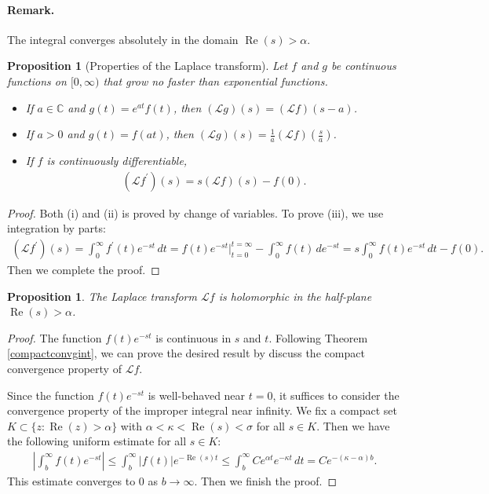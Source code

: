 \documentclass{article}
\numberwithin{equation}{section}
\newcommand{\bbC}{\mathbb{C}}
\renewcommand{\cal}{\mathcal}
\DeclareMathOperator{\re}{Re}
\theoremstyle{plain}
\newtheorem{proposition}[theorem]{Proposition}
\theoremstyle{definition}
\begin{document}
\paragraph{Remark.} The integral converges absolutely in the domain $\re(s)>\alpha$.
\begin{proposition}[Properties of the Laplace transform]
	Let $f$ and $g$ be continuous functions on $[0,\infty)$ that grow no faster than exponential functions.
	\begin{itemize}
		\item[(i)] If $a\in\bbC$ and $g(t)=e^{at} f(t)$, then $(\cal{L}g)(s)=(\cal{L}f)(s-a)$.
		\item[(ii)] If $a>0$ and $g(t)=f(at)$, then $(\cal{L}g)(s)=\frac{1}{a}(\cal{L}f)\left(\frac{s}{a}\right)$.
		\item[(iii)] If $f$ is continuously differentiable,
		\begin{align*}
			(\cal{L}f^\prime)(s)=s(\cal{L}f)(s)-f(0).
		\end{align*}
	\end{itemize}
\end{proposition}
\begin{proof}
	Both (i) and (ii) is proved by change of variables. To prove (iii), we use integration by parts:
	\begin{align*}
		(\cal{L}f^\prime)(s)=\int_0^\infty f^\prime(t)e^{-st}\,dt=f(t)e^{-st}\big|_{t=0}^{t=\infty}-\int_0^\infty f(t)\,de^{-st}=s\int_0^\infty f(t)e^{-st}\,dt-f(0).
	\end{align*}
	Then we complete the proof.
\end{proof}

\begin{proposition}
The Laplace transform $\cal{L}f$ is holomorphic in the half-plane $\re(s)>\alpha$.
\end{proposition}
\begin{proof}
The function $f(t)e^{-st}$ is continuous in $s$ and $t$. Following Theorem \ref{compactconvgint}, we can prove the desired result by discuss the compact convergence property of $\cal{L}f$.

Since the function $f(t)e^{-st}$ is well-behaved near $t=0$, it suffices to consider the convergence property of the improper integral near infinity. We fix a compact set $K\subset\{z:\re(z)>\alpha\}$ with $\alpha<\kappa<\re(s)<\sigma$ for all $s\in K$. Then we have the following uniform estimate for all $s\in K$:
\begin{align*}
	\left\vert\int_b^\infty f(t)e^{-st}\right\vert\leq\int_b^\infty\vert f(t)\vert e^{-\re(s)t}\leq \int_b^\infty Ce^{\alpha t} e^{-\kappa t}\,dt=Ce^{-(\kappa-\alpha)b}.
\end{align*}
This estimate converges to $0$ as $b\to\infty$. Then we finish the proof.
\end{proof}
\end{document}
